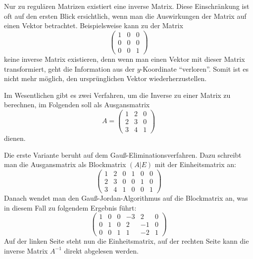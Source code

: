 Nur zu regulären Matrizen existiert eine inverse Matrix. Diese Einschränkung ist oft auf den ersten Blick ersichtlich, wenn man die Auswirkungen der Matrix auf einen Vektor betrachtet. Beispielsweise kann zu der Matrix
\begin{equation}
 \begin{pmatrix}
  1 & 0 & 0 \\
  0 & 0 & 0 \\
  0 & 0 & 1
 \end{pmatrix}
\end{equation}
keine inverse Matrix existieren, denn wenn man einen Vektor mit dieser Matrix transformiert, geht die Information aus der $y$-Koordinate \enquote{verloren}. Somit ist es nicht mehr möglich, den ursprünglichen Vektor wiederherzustellen.

Im Wesentlichen gibt es zwei Verfahren, um die Inverse zu einer Matrix zu berechnen, im Folgenden soll als Ausgansmatrix
\begin{equation*}
 A = \begin{pmatrix}
	1 & 2 & 0 \\
    2 & 3 & 0 \\
    3 & 4 & 1
 \end{pmatrix}
\end{equation*}
dienen.

Die erste Variante beruht auf dem Gauß-Eliminationsverfahren. Dazu schreibt man die Ausgansmatrix als Blockmatrix $(A|E)$ mit der Einheitsmatrix an:
\begin{equation}
 \left(\begin{array}{ccc|ccc}
    1 & 2 & 0 &  1 & 0 & 0 \\
    2 & 3 & 0 &  0 & 1 & 0 \\
    3 & 4 & 1 &  0 & 0 & 1
  \end{array}\right)
\end{equation}
Danach wendet man den Gauß-Jordan-Algorithmus auf die Blockmatrix an, was in diesem Fall zu folgendem Ergebnis führt:
\begin{equation}
  \left(\begin{array}{ccc|ccc}
    1 & 0 & 0  & -3 & 2 & 0 \\
    0 & 1 & 0  & 2 & -1 & 0 \\
    0 & 0 & 1  & 1 & -2 & 1
  \end{array}\right)
\end{equation}
Auf der linken Seite steht nun die Einheitsmatrix, auf der rechten Seite kann die inverse Matrix $A^{-1}$ direkt abgelesen werden.

